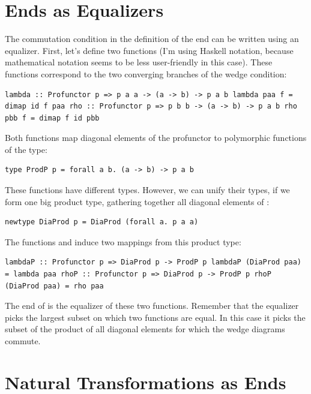 \section{Ends as Equalizers}\label{ends-as-equalizers}

The commutation condition in the definition of the end can be written
using an equalizer. First, let's define two functions (I'm using Haskell
notation, because mathematical notation seems to be less user-friendly
in this case). These functions correspond to the two converging branches
of the wedge condition:

\begin{verbatim}
lambda :: Profunctor p => p a a -> (a -> b) -> p a b lambda paa f = dimap id f paa rho :: Profunctor p => p b b -> (a -> b) -> p a b rho pbb f = dimap f id pbb
\end{verbatim}

Both functions map diagonal elements of the profunctor  to
polymorphic functions of the type:

\begin{verbatim}
type ProdP p = forall a b. (a -> b) -> p a b
\end{verbatim}

These functions have different types. However, we can unify their types,
if we form one big product type, gathering together all diagonal
elements of :

\begin{verbatim}
newtype DiaProd p = DiaProd (forall a. p a a)
\end{verbatim}

The functions  and  induce two mappings from
this product type:

\begin{verbatim}
lambdaP :: Profunctor p => DiaProd p -> ProdP p lambdaP (DiaProd paa) = lambda paa rhoP :: Profunctor p => DiaProd p -> ProdP p rhoP (DiaProd paa) = rho paa
\end{verbatim}

The end of  is the equalizer of these two functions. Remember
that the equalizer picks the largest subset on which two functions are
equal. In this case it picks the subset of the product of all diagonal
elements for which the wedge diagrams commute.

\section{Natural Transformations as
Ends}\label{natural-transformations-as-ends}

